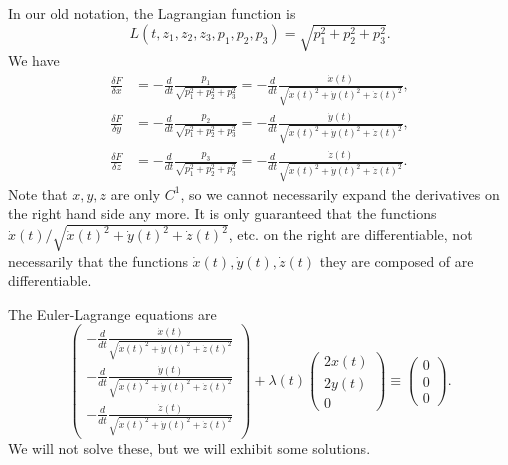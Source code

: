 \documentclass[11pt]{article}
\begin{document}
\begin{enumerate}
In our old notation, the Lagrangian function is
\[
L(t, z_1,z_2,z_3, p_1,p_2,p_3) = \sqrt{p_1^2 + p_2^2 + p_3^2}.
\]
We have
\begin{align*}
\frac{\delta F}{\delta x} &= -\frac{d}{dt} \frac{p_1}{\sqrt{p_1^2 + p_2^2 + p_3^2}} = -\frac{d}{dt} \frac{\dot{x}(t)}{\sqrt{\dot{x}(t)^2 + \dot{y}(t)^2 + \dot{z}(t)^2}}, \\
\frac{\delta F}{\delta y} &= -\frac{d}{dt} \frac{p_2}{\sqrt{p_1^2 + p_2^2 + p_3^2}} = -\frac{d}{dt} \frac{\dot{y}(t)}{\sqrt{\dot{x}(t)^2 + \dot{y}(t)^2 + \dot{z}(t)^2}}, \\ 
\frac{\delta F}{\delta z} &= -\frac{d}{dt} \frac{p_3}{\sqrt{p_1^2 + p_2^2 + p_3^2}} =  -\frac{d}{dt} \frac{\dot{z}(t)}{\sqrt{\dot{x}(t)^2 + \dot{y}(t)^2 + \dot{z}(t)^2}}.
\end{align*}
Note that $x,y,z$ are only $C^1$, so we cannot necessarily expand the derivatives on the right hand side any more. It is only guaranteed that the functions $\dot{x}(t) / \sqrt{\dot{x}(t)^2 + \dot{y}(t)^2 + \dot{z}(t)^2}$, etc. on the right are differentiable, not necessarily that the functions $\dot{x}(t), \dot{y}(t), \dot{z}(t)$ they are composed of are differentiable.

The Euler-Lagrange equations are
\[
\begin{pmatrix}
-\frac{d}{dt} \frac{\dot{x}(t)}{\sqrt{\dot{x}(t)^2 + \dot{y}(t)^2 + \dot{z}(t)^2}} \\
-\frac{d}{dt} \frac{\dot{y}(t)}{\sqrt{\dot{x}(t)^2 + \dot{y}(t)^2 + \dot{z}(t)^2}} \\
-\frac{d}{dt} \frac{\dot{z}(t)}{\sqrt{\dot{x}(t)^2 + \dot{y}(t)^2 + \dot{z}(t)^2}}
\end{pmatrix} + \lambda(t) \begin{pmatrix}
2x(t) \\ 2y(t) \\ 0
\end{pmatrix} \equiv \begin{pmatrix}
0 \\ 0 \\ 0
\end{pmatrix}.
\]
We will not solve these, but we will exhibit some solutions.


\end{enumerate}
\end{document}
